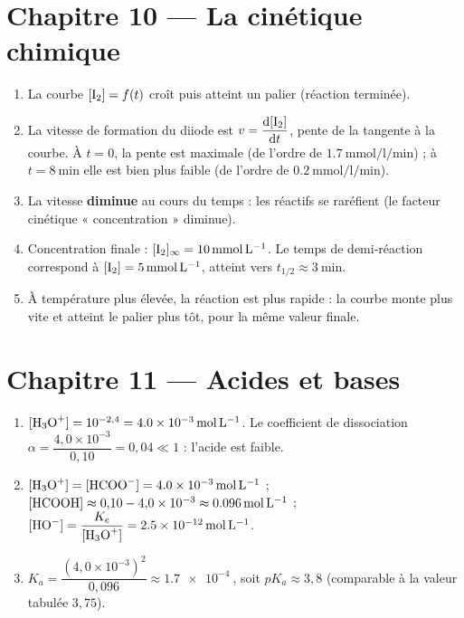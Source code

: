 \section{Chapitre 10 — La cinétique chimique}

\begin{enumerate}[label=\arabic*)]
\item La courbe $[\ce{I2}] = f(t)$ croît puis atteint un palier (réaction terminée).
\item La vitesse de formation du diiode est $v = \dfrac{\mathrm{d}[\ce{I2}]}{\mathrm{d} t}$, pente de la
tangente à la courbe. À $t = 0$, la pente est maximale (de l'ordre de
$\SI{1.7}{\milli\mol\per\litre\per\minute}$) ; à $t = \SI{8}{\minute}$ elle est bien
plus faible (de l'ordre de $\SI{0.2}{\milli\mol\per\litre\per\minute}$).
\item La vitesse \textbf{diminue} au cours du temps : les réactifs se raréfient (le
facteur cinétique « concentration » diminue).
\item Concentration finale : $[\ce{I2}]_\infty = \SI{10}{\milli\mol\per\litre}$. Le temps
de demi-réaction correspond à $[\ce{I2}] = \SI{5}{\milli\mol\per\litre}$, atteint vers
$t_{1/2} \approx \SI{3}{\minute}$.
\item À température plus élevée, la réaction est plus rapide : la courbe monte plus
vite et atteint le palier plus tôt, pour la même valeur finale.
\end{enumerate}

\section{Chapitre 11 — Acides et bases}

\begin{enumerate}[label=\arabic*)]
\item $[\ce{H3O+}] = 10^{-2{,}4} = \SI{4.0e-3}{\mol\per\litre}$. Le coefficient de
dissociation $\alpha = \dfrac{4{,}0\times10^{-3}}{0{,}10} = 0{,}04 \ll 1$ : l'acide est faible.
\item $[\ce{H3O+}] = [\ce{HCOO-}] = \SI{4.0e-3}{\mol\per\litre}$ ;
$[\ce{HCOOH}] \approx 0{,}10 - 4{,}0\times10^{-3} \approx \SI{0.096}{\mol\per\litre}$ ;
$[\ce{HO-}] = \dfrac{K_e}{[\ce{H3O+}]} = \SI{2.5e-12}{\mol\per\litre}$.
\item $K_a = \dfrac{(4{,}0\times10^{-3})^2}{0{,}096} \approx \SI{1.7e-4}{}$, soit
$pK_a \approx 3{,}8$ (comparable à la valeur tabulée $3{,}75$).
\end{enumerate}

